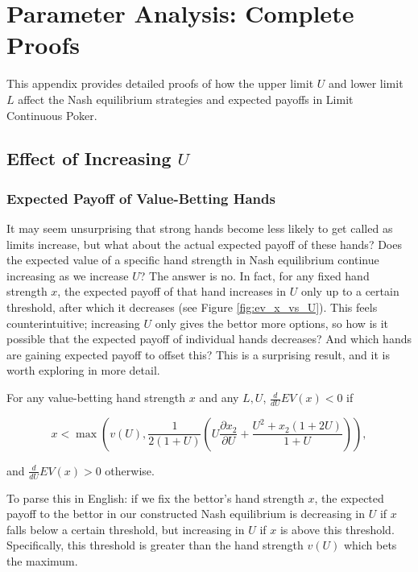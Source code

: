 \documentclass[../../main/main.tex]{subfiles}
\begin{document}
\section{Parameter Analysis: Complete Proofs}
\label{sec:parameter_analysis}

This appendix provides detailed proofs of how the upper limit $U$ and lower limit $L$ affect the Nash equilibrium strategies and expected payoffs in Limit Continuous Poker.

\subsection{Effect of Increasing $U$}

\subsubsection{Expected Payoff of Value-Betting Hands}

It may seem unsurprising that strong hands become less likely to get called as limits increase, but what about the actual expected payoff of these hands? Does the expected value of a specific hand strength in Nash equilibrium continue increasing as we increase $U$? The answer is no. In fact, for any fixed hand strength $x$, the expected payoff of that hand increases in $U$ only up to a certain threshold, after which it decreases (see Figure \ref{fig:ev_x_vs_U}). This feels counterintuitive; increasing $U$ only gives the bettor more options, so how is it possible that the expected payoff of individual hands decreases? And which hands are gaining expected payoff to offset this? This is a surprising result, and it is worth exploring in more detail.

\begin{theorem}
    \label{thm:payoff_increasing}
    For any value-betting hand strength $x$ and any $L, U$, $\frac{d}{dU} EV(x) < 0$ if

    $$x < \max\left(v(U), \frac{1}{2(1+U)} \left( U \frac{\partial x_2}{\partial U} + \frac{U^2 + x_2(1 + 2U)}{1+U} \right) \right),$$

    and $\frac{d}{dU} EV(x) > 0$ otherwise.
\end{theorem}

To parse this in English: if we fix the bettor's hand strength $x$, the expected payoff to the bettor in our constructed Nash equilibrium is decreasing in $U$ if $x$ falls below a certain threshold, but increasing in $U$ if $x$ is above this threshold. Specifically, this threshold is greater than the hand strength $v(U)$ which bets the maximum.
\end{document}
